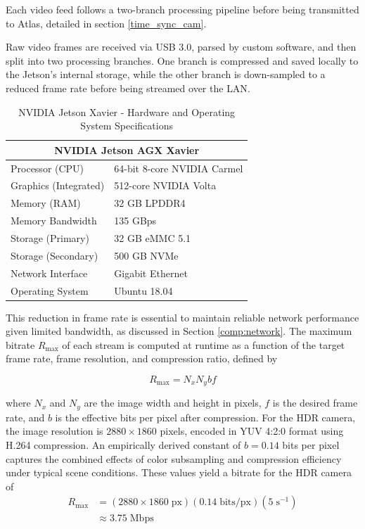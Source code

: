 \documentclass{erauthesis}
\begin{document}
Each video feed follows a two-branch processing pipeline before being transmitted to Atlas, detailed in section \ref{time_sync_cam}.

Raw video frames are received via USB 3.0, parsed by custom software, and then split into two processing branches. 
One branch is compressed and saved locally to the Jetson's internal storage, while the other branch is down-sampled to a reduced frame rate before being streamed over the \ac{LAN}.%





\begin{table}[htpb]
\centering
\begin{tabular}{ll}
\hline
\multicolumn{2}{c}{NVIDIA Jetson AGX Xavier} \\
\hline
\hline
Processor (CPU) & 64-bit 8-core NVIDIA Carmel \\
Graphics (Integrated) & 512-core NVIDIA Volta \\
Memory (RAM) & 32 GB LPDDR4 \\
Memory Bandwidth & 135 GBps \\
Storage (Primary) & 32 GB eMMC 5.1 \\
Storage (Secondary) & 500 GB NVMe \\
Network Interface & Gigabit Ethernet \\
Operating System & Ubuntu 18.04 \\
\hline
\end{tabular}
\caption{NVIDIA Jetson Xavier - Hardware and Operating System Specifications}
\label{table:Xavier_hardware}
\end{table}

This reduction in frame rate is essential to maintain reliable network performance given limited bandwidth, as discussed in Section \ref{comp:network}. 
The maximum bitrate $R_{\text{max}}$ of each stream is computed at runtime as a function of the target frame rate, frame resolution, and compression ratio, defined by

\begin{equation}
    R_{\text{max}} = N_x N_y b f
\end{equation}

where $N_x$ and $N_y$ are the image width and height in pixels, $f$ is the desired frame rate, and $b$ is the effective bits per pixel after compression.
For the HDR camera, the image resolution is $2880 \times 1860$ pixels, encoded in YUV 4:2:0 format using H.264 compression.
An empirically derived constant of $b = 0.14$ bits per pixel captures the combined effects of color subsampling and compression efficiency under typical scene conditions.
These values yield a bitrate for the HDR camera of
\begin{equation*}
    \begin{split}
        R_{\text{max}} & = (2880 \times 1860\; \text{px}) (0.14 \;\text{bits/px})(5\;\text{s}^{-1})  \\
        & \approx 3.75\; \text{Mbps}
    \end{split}
\end{equation*}
\end{document}
